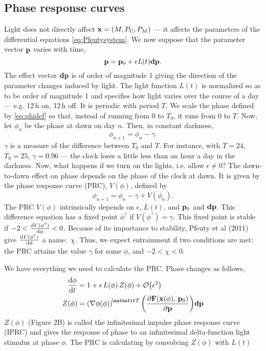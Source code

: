 \documentclass[10pt,letter, swedish, english,%
]{article}
\newcommand{\T}{{\!\mathsfrm{T}}}
\begin{document}
\subsection{Phase response curves}
Light does not directly affect  $\vb{x}=(M,P_{\text{C}},{P}_{M})$ --- it affects the
parameters of the differential equations \eqref{eq:Pfeutysystem}. We now suppose that the
parameter vector  $\vb{p}$ varies with time,
\begin{equation}
\vb{p}=\vb{p}_{0}+\mathit{\epsilon L}(t)\vb{dp}.
\end{equation}
The effect vector  $\vb{dp}$ is of order of magnitude 1 giving the
direction of the parameter changes induced by light. The light function 
$L(t)$ is normalized so as to be order of magnitude 1 and specifies
how light varies over the course of a day --- e.g. 12\,h on, 12\,h off. It
is periodic with period  $T$. We scale the phase defined by \eqref{eq:phidef} so
that, instead of running from 0 to  ${T}_{0}$, it runs from 0 to 
$T$. Now, let  ${\phi}_{n}$ be the phase at dawn on day  $n$.
Then, in constant darkness,
\begin{equation}
\phi_{n+1}=\phi_{n}-\gamma.
\end{equation}
$\gamma$ is a measure of the difference between  ${T}_{0}$ and  $T$.
For instance, with  $T=24$, ${T}_{0}=25$, $\gamma =0.96$ --- the clock
loses a little less than an hour a day in the darkness. Now, what
happens if we turn on the lights, i.e. allow  $\epsilon\neq0$? The
dawn-to-dawn effect on phase depends on the phase of the clock at
dawn. It is given by the phase response curve (PRC),  $V(\phi)$,
defined by 
\begin{equation}
\phi_{n+1}=\phi_{n}-\gamma +V(\phi_{n}).
\end{equation}
The PRC $V(\phi)$ intrinsically depends on  $\epsilon$,  $L(t)$, and
$\vb{p}_{0}$ and  $\vb{dp}$. This difference equation has a fixed
point  ${\phi}^{?}$ if  $V({\phi}^{?})=\gamma $.
This fixed point is stable if  
$-2<\dv{V(\phi^{*})}{\phi}<0$. 
Because of its importance to stability, Pfeuty et al (2011) give 
$\dv{V(\phi^{*})}{\phi}$ a name:~$\chi$. 
Thus, we expect entrainment if two conditions are met: the PRC attains
the value  $\gamma$ for some  $\phi$, and  $-2<\chi<0$. 


\bigskip
We have everything we need to calculate the PRC. Phase changes as
follows, 
\begin{equation}
\begin{aligned}
\dv{\phi}{t}&=1+\epsilon\,L(\phi)\,Z(\phi)+\order{\epsilon^2}
\\
Z(\phi)&={({\nabla}\phi(\phi))}^{\T}\,
\qty(\pdv{\vb{F}(\vb{x}(\phi),\, \vb{p}_{0})}{\vb{p}})\vb{dp}
\end{aligned}
\end{equation}
$Z(\phi)$ (Figure 2B) is called the infinitesimal impulse phase
response curve (IPRC) and gives the response of phase to an
infinitesimal delta-function light stimulus at phase  $\phi$. The
PRC is calculating by convolving  $Z(\phi)$ with  $L(t)$
\end{document}
